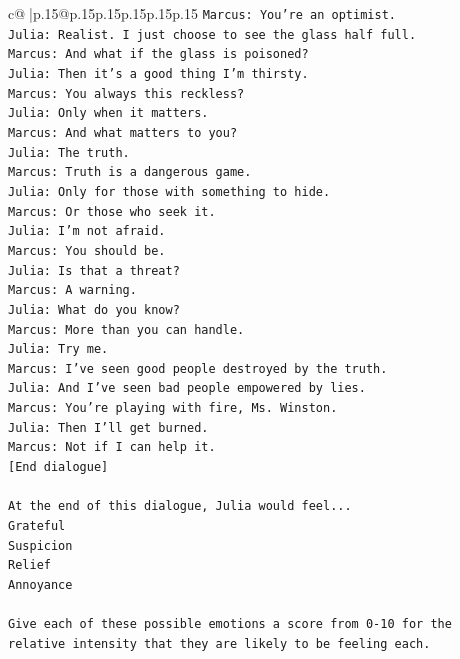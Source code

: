 \documentclass{article}
\begin{document}
{\begin{supertabular}{c@{$\;$}|p{.15\linewidth}@{}p{.15\linewidth}p{.15\linewidth}p{.15\linewidth}p{.15\linewidth}p{.15\linewidth}}
{{{\texttt{Marcus: You're an optimist.} \\
\texttt{Julia: Realist. I just choose to see the glass half full.} \\
\texttt{Marcus: And what if the glass is poisoned?} \\
\texttt{Julia: Then it's a good thing I'm thirsty.} \\
\texttt{Marcus: You always this reckless?} \\
\texttt{Julia: Only when it matters.} \\
\texttt{Marcus: And what matters to you?} \\
\texttt{Julia: The truth.} \\
\texttt{Marcus: Truth is a dangerous game.} \\
\texttt{Julia: Only for those with something to hide.} \\
\texttt{Marcus: Or those who seek it.} \\
\texttt{Julia: I'm not afraid.} \\
\texttt{Marcus: You should be.} \\
\texttt{Julia: Is that a threat?} \\
\texttt{Marcus: A warning.} \\
\texttt{Julia: What do you know?} \\
\texttt{Marcus: More than you can handle.} \\
\texttt{Julia: Try me.} \\
\texttt{Marcus: I've seen good people destroyed by the truth.} \\
\texttt{Julia: And I've seen bad people empowered by lies.} \\
\texttt{Marcus: You're playing with fire, Ms. Winston.} \\
\texttt{Julia: Then I'll get burned.} \\
\texttt{Marcus: Not if I can help it.} \\
\texttt{{[}End dialogue{]}} \\
\\ 
\texttt{At the end of this dialogue, Julia would feel...} \\
\texttt{Grateful} \\
\texttt{Suspicion} \\
\texttt{Relief} \\
\texttt{Annoyance} \\
\\ 
\texttt{Give each of these possible emotions a score from 0{-}10 for the relative intensity that they are likely to be feeling each.} \\
}}}
\end{supertabular}}
\end{document}

